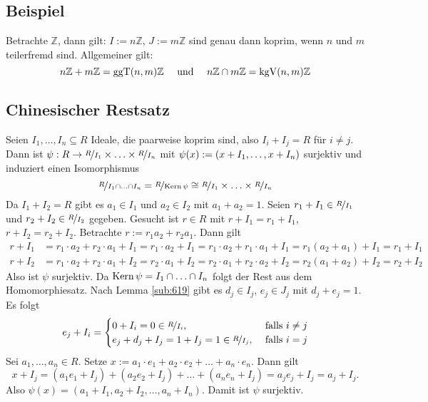 \subsection[Beispiel: Koprime Ideale in $\mathds{Z}$]{Beispiel} %
\label{sub:617}
Betrachte $\mathds{Z}$, dann gilt: $I := n \mathds{Z}, \, J := m \mathds{Z}$ sind genau dann koprim, wenn $n$ und $m$ teilerfremd sind. Allgemeiner gilt: 
\[
	n \mathbb{Z} + m \mathbb{Z} = \operatorname{ggT}(n,m)  \mathbb{Z} \quad \text{ und } \quad n \mathbb{Z} \cap m \mathbb{Z} = \operatorname{kgV}(n,m) \mathbb{Z}
\]

\subsection{Chinesischer Restsatz} %
\label{sub:618}
Seien $I_1, \ldots , I_n \subseteq R$ Ideale, die paarweise koprim sind, also $I_i + I_j =R$ für $i\not= j$. Dann ist 
$\psi : R \to \nicefrac{R}{I_1} \times \ldots \times \nicefrac{R}{I_n}$ mit $\psi(x) := (x+ I_1, \ldots , x+ I_n)$ surjektiv und induziert einen Isomorphismus
\[
	\nicefrac{R}{I_1 \cap \ldots \cap I_n} = \nicefrac{R}{\operatorname{Kern} \psi} \cong \nicefrac{R}{I_1} \times \ldots \times \nicefrac{R}{I_n}
\]
Da $I_1 + I_2 =R$ gibt es $a_1 \in I_1$ und $a_2 \in I_2$ mit $a_1 + a_2 = 1$. Seien $r_1 + I_1 \in \nicefrac{R}{I_1}$ und $r_2 + I_2 \in \nicefrac{R}{I_2}$ gegeben.
Gesucht ist $r \in R$ mit $r+ I_1 = r_1+I_1$, $r+ I_2 = r_2 + I_2$. Betrachte $r := r_1 a_2 + r_2 a_1$. Dann gilt 
\begin{align*}
	r + I_1 &= r_1 \cdot a_2 + r_2 \cdot a_1 + I_1 = r_1 \cdot a_2 +I_1 = r_1 \cdot a_2 + r_1 \cdot a_1 +I_1 = r_1(a_2 +a_1) +I_1 = r_1 + I_1 \\
	r + I_2 &= r_1 \cdot a_2 + r_2 \cdot a_1 + I_2 = r_2 \cdot a_1 + I_2 = r_2 \cdot a_1 + r_2 \cdot a_2 + I_2 = r_2(a_1+ a_2) + I_2 = r_2 + I_2
\end{align*}
Also ist $\psi$ surjektiv. Da $\operatorname{Kern} \psi = I_1 \cap \ldots \cap I_n$ folgt der Rest aus dem Homomorphiesatz. \bewende
{}
Nach Lemma \ref{sub:619} gibt es $d_j \in I_j$, $e_j \in J_j$ mit $d_j + e_j = 1$. Es folgt 
\[
	e_j + I_i = \begin{cases}
		0+ I_i = 0 \in \nicefrac{R}{I_i}, &\text{ falls }i \not= j\\
		e_j + d_j + I_j = 1+ I_j = 1 \in \nicefrac{R}{I_j}, &\text{ falls } i=j
	\end{cases}
\]
Sei $a_1, \ldots , a_n \in R$. Setze $x := a_1 \cdot e_1 + a_2 \cdot e_2 + \ldots + a_n \cdot e_n$. Dann gilt
\[
	x+I_j = (a_1 e_1 + I_j) + (a_2 e_2 + I_j) + \ldots + (a_n e_n + I_j) = a_j e_j + I_j = a_j + I_j.
\]
Also $\psi(x) = (a_1 + I_1, a_2 + I_2, \ldots , a_n +I_n)$. Damit ist $\psi$ surjektiv. \bewende

